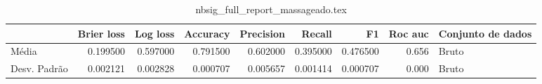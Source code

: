 \begin{table}
\centering
\caption{nbsig_full_report_massageado.tex}
\label{nbsig_full_report_massageado.tex}
\begin{tabular}{lrrrrrrrl}
\toprule
{} &  Brier  loss &  Log loss &  Accuracy  &  Precision  &   Recall  &       F1  &  Roc auc  & Conjunto de dados \\
\midrule
Média        &     0.199500 &  0.597000 &   0.791500 &    0.602000 &  0.395000 &  0.476500 &     0.656 &             Bruto \\
Desv. Padrão &     0.002121 &  0.002828 &   0.000707 &    0.005657 &  0.001414 &  0.000707 &     0.000 &             Bruto \\
\bottomrule
\end{tabular}
\end{table}
